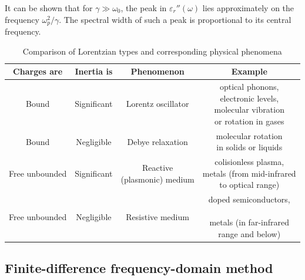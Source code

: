 It can be shown that for $\gamma \gg \omega_0$, the peak in $\varepsilon_r''(\omega)$ lies approximately on the frequency $\omega_p^{2}/\gamma$. The spectral width of such a peak is proportional to its central frequency. 

\begin{table}[ht]   \caption{Comparison of Lorentzian types and corresponding physical phenomena}  \label{tb_lorentzians} \centering 
\begin{tabular}{cc|cc}
 \toprule
\textbf{Charges are}	& \textbf{Inertia is}				& \textbf{Phenomenon}				& \textbf{Example}		 \\
 \hline
Bound		& Significant				& Lorentz oscillator					& \shortstack{optical phonons, \\electronic levels,\\ molecular vibration \\or rotation in gases}	\\
 \hline
Bound		& Negligible				& Debye relaxation						& \shortstack{molecular rotation \\in solids or liquids} \\
 \hline
Free unbounded	& Significant				& \shortstack{Reactive\\(plasmonic) medium}			& \shortstack{colisionless plasma, \\metals (from mid-infrared\\to optical range)} \\
 \hline
Free unbounded	& Negligible				& Resistive medium						& \shortstack{doped semiconductors,\\\newline metals (in far-infrared\\ range and below)} \\
 \bottomrule
 \end{tabular} \end{table}

\subsection{Finite-difference frequency-domain method} %
